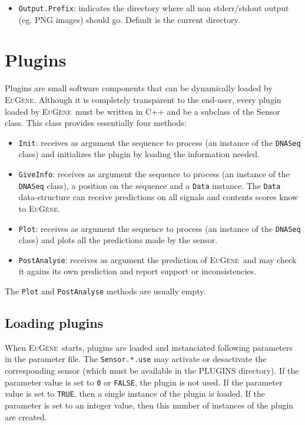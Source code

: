 \documentclass[a4paper,titlepage]{report}
\newcommand{\EuGenie}{\textsc{EuG\`ene}}
\begin{document}
\begin{itemize}
\item \texttt{Output.Prefix}: indicates the directory where all non
  stderr/stdout output (eg. PNG images) should go. Default is the
  current directory.
\end{itemize}

\section{Plugins}
\label{plug}

Plugins are small software components that can be dynamically loaded
by \EuGenie. Although it is completely transparent to the end-user,
every plugin loaded by \EuGenie\ must be written in C++ and be a
subclass of the Sensor class. This class provides essentially four
methods:
\begin{itemize}
\item \texttt{Init}: receives as argument the sequence to process (an
  instance of the \texttt{DNASeq} class) and initializes the plugin by
  loading the information needed.
\item \texttt{GiveInfo}: receives as argument the sequence to process
  (an instance of the \texttt{DNASeq} class), a position on the
  sequence and a \texttt{Data} instance. The \texttt{Data}
  data-structure can receive predictions on all signals and contents
  scores know to \EuGenie.
\item \texttt{Plot}: receives as argument the sequence to process (an
  instance of the \texttt{DNASeq} class) and plots all the predictions
  made by the sensor.
\item \texttt{PostAnalyse}: receives as argument the prediction of
  \EuGenie\ and may check it agains its own prediction and report
  support or inconsistencies.
\end{itemize}

The \texttt{Plot} and \texttt{PostAnalyse} methods are usually empty.

\subsection{Loading plugins}

When \EuGenie\ starts, plugins are loaded and instanciated following
parameters in the parameter file. The \texttt{Sensor.*.use} may
activate or desactivate the corresponding sensor (which must be
available in the PLUGINS directory). If the parameter value is set to
\texttt{0} or \texttt{FALSE}, the plugin is not used. If the parameter
value is set to \texttt{TRUE}, then a single instance of the plugin is
loaded. If the parameter is set to an integer value, then this number
of instances of the plugin are created.
\end{document}
